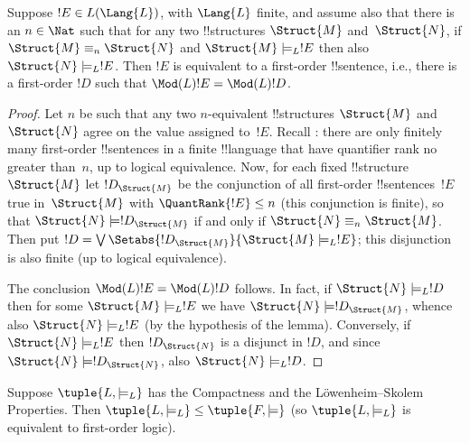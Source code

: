\documentclass[../../../include/open-logic-section]{subfiles}
\begin{document}

\begin{lem}
Suppose $!E \in L(\Lang{L})$, with $\Lang{L}$ finite, and assume
also that there is an $n \in \Nat$ such that for any two
!!{structure}s $\Struct{M}$ and~$\Struct{N}$, if $\Struct{M} \equiv_n
\Struct{N}$ and $\Struct{M} \models_L !E$ then also $\Struct{N}
\models_L !E$. Then $!E$ is equivalent to a first-order
!!{sentence}, i.e., there is a first-order $!D$ such that
$\Mod(L){!E} = \Mod(L){!D}$.
\end{lem}

\begin{proof} 
Let $n$ be such that any two $n$-equivalent !!{structure}s
$\Struct{M}$ and $\Struct{N}$ agree on the value assigned to~$!E$.
Recall : there are only finitely many
first-order !!{sentence}s in a finite !!{language} that have
quantifier rank no greater than~$n$, up to logical equivalence. Now,
for each fixed !!{structure}~$\Struct{M}$ let $!D_{\Struct{M}}$ be the
conjunction of all first-order !!{sentence}s~$!E$ true in~$\Struct{M}$
with $\QuantRank{!E} \le n$ (this conjunction is finite), so that
$\Struct{N} \models !D_{\Struct{M}}$ if and only if $\Struct{N}
\equiv_n \Struct{M}$. Then put $!D = \textstyle\bigvee
\Setabs{!D_{\Struct{M}}}{\Struct{M} \models_L !E}$; this disjunction
is also finite (up to logical equivalence).

The conclusion $\Mod(L){!E} = \Mod(L){!D}$ follows. In fact, if
$\Struct{N} \models_L !D$ then for some $\Struct{M} \models_L
!E$ we have $\Struct{N} \models !D_{\Struct{M}}$, whence also
$\Struct{N} \models_L !E$ (by the hypothesis of the
lemma). Conversely, if $\Struct{N} \models_L !E$ then
$!D_\Struct{N}$ is a disjunct in $!D$, and since $\Struct{N}
\models !D_\Struct{N}$, also $\Struct{N} \models_L !D$.
\end{proof}

\begin{thm}
   Suppose $\tuple{L, \models_L}$ has the
  Compactness and the L\"owenheim--Skolem Properties. Then
  $\tuple{L, \models_L} \le \tuple{F, \models}$ (so
  $\tuple{L, \models_L}$ is equivalent to first-order logic).
\end{thm}
\end{document}
